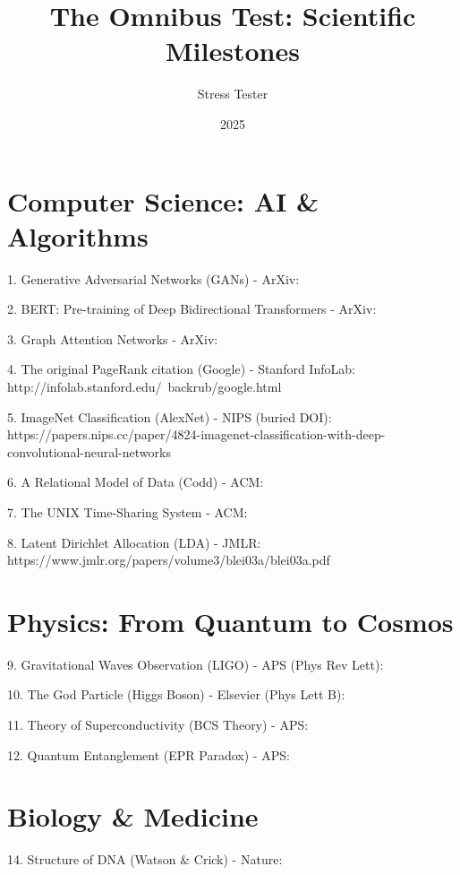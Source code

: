 \documentclass[12pt]{article}
\title{The Omnibus Test: Scientific Milestones}
\author{Stress Tester}
\date{2025}
\begin{document}
\maketitle

\section{Computer Science: AI \& Algorithms}
1. Generative Adversarial Networks (GANs) - ArXiv:
\cite{Goodfellow2014generative}

2. BERT: Pre-training of Deep Bidirectional Transformers - ArXiv:
\cite{Devlin2018bertpretra}

3. Graph Attention Networks - ArXiv:
\cite{Veličković2017graphatten}

4. The original PageRank citation (Google) - Stanford InfoLab:
http://infolab.stanford.edu/~backrub/google.html

5. ImageNet Classification (AlexNet) - NIPS (buried DOI):
https://papers.nips.cc/paper/4824-imagenet-classification-with-deep-convolutional-neural-networks

6. A Relational Model of Data (Codd) - ACM:
\cite{Codd1970arelationa}

7. The UNIX Time-Sharing System - ACM:
\cite{Ritchie1974theunixtim}

8. Latent Dirichlet Allocation (LDA) - JMLR:
https://www.jmlr.org/papers/volume3/blei03a/blei03a.pdf

\section{Physics: From Quantum to Cosmos}
9. Gravitational Waves Observation (LIGO) - APS (Phys Rev Lett):
\cite{Abbott2016observatio}

10. The God Particle (Higgs Boson) - Elsevier (Phys Lett B):
\cite{Aad2012observatio}

11. Theory of Superconductivity (BCS Theory) - APS:
\cite{Bardeen1957theoryofsu}

12. Quantum Entanglement (EPR Paradox) - APS:
\cite{Einstein1935canquantum}

\section{Biology \& Medicine}
14. Structure of DNA (Watson & Crick) - Nature:
\cite{WATSON1953moleculars}
\end{document}
